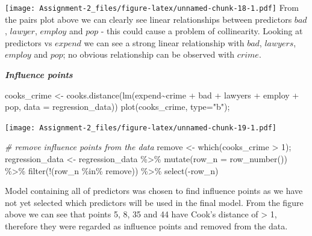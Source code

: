 \documentclass[
  10pt,
]{article}
\newenvironment{Shaded}{\begin{snugshade}}{\end{snugshade}}
\newcommand{\AttributeTok}[1]{\textcolor[rgb]{0.77,0.63,0.00}{#1}}
\newcommand{\CommentTok}[1]{\textcolor[rgb]{0.56,0.35,0.01}{\textit{#1}}}
\newcommand{\DecValTok}[1]{\textcolor[rgb]{0.00,0.00,0.81}{#1}}
\newcommand{\FunctionTok}[1]{\textcolor[rgb]{0.00,0.00,0.00}{#1}}
\newcommand{\NormalTok}[1]{#1}
\newcommand{\OtherTok}[1]{\textcolor[rgb]{0.56,0.35,0.01}{#1}}
\newcommand{\SpecialCharTok}[1]{\textcolor[rgb]{0.00,0.00,0.00}{#1}}
\newcommand{\StringTok}[1]{\textcolor[rgb]{0.31,0.60,0.02}{#1}}
\begin{document}
\texttt{[image: Assignment-2\_files/figure-latex/unnamed-chunk-18-1.pdf]}
From the pairs plot above we can clearly see linear relationships
between predictors \(bad\), \(lawyer\), \(employ\) and \(pop\) - this
could cause a problem of collinearity. Looking at predictors vs
\(expend\) we can see a strong linear relationship with \(bad\),
\(lawyers\), \(employ\) and \(pop\); no obvious relationship can be
observed with \(crime\).

\textbf{\emph{Influence points}}

\begin{Shaded}
\begin{Highlighting}[]
\NormalTok{cooks\_crime }\OtherTok{\textless{}{-}} \FunctionTok{cooks.distance}\NormalTok{(}\FunctionTok{lm}\NormalTok{(expend}\SpecialCharTok{\textasciitilde{}}\NormalTok{crime }\SpecialCharTok{+}\NormalTok{ bad }\SpecialCharTok{+}\NormalTok{ lawyers }\SpecialCharTok{+}\NormalTok{ employ }\SpecialCharTok{+}\NormalTok{ pop, }
                                 \AttributeTok{data =}\NormalTok{ regression\_data))}
\FunctionTok{plot}\NormalTok{(cooks\_crime, }\AttributeTok{type=}\StringTok{"b"}\NormalTok{);}
\end{Highlighting}
\end{Shaded}

\texttt{[image: Assignment-2\_files/figure-latex/unnamed-chunk-19-1.pdf]}

\begin{Shaded}
\begin{Highlighting}[]
\CommentTok{\# remove influence points from the data}
\NormalTok{remove }\OtherTok{\textless{}{-}} \FunctionTok{which}\NormalTok{(cooks\_crime }\SpecialCharTok{\textgreater{}} \DecValTok{1}\NormalTok{); }
\NormalTok{regression\_data }\OtherTok{\textless{}{-}}\NormalTok{ regression\_data }\SpecialCharTok{\%\textgreater{}\%} \FunctionTok{mutate}\NormalTok{(}\AttributeTok{row\_n =} \FunctionTok{row\_number}\NormalTok{()) }\SpecialCharTok{\%\textgreater{}\%}
  \FunctionTok{filter}\NormalTok{(}\SpecialCharTok{!}\NormalTok{(row\_n }\SpecialCharTok{\%in\%}\NormalTok{ remove)) }\SpecialCharTok{\%\textgreater{}\%} \FunctionTok{select}\NormalTok{(}\SpecialCharTok{{-}}\NormalTok{row\_n)}
\end{Highlighting}
\end{Shaded}

Model containing all of predictors was chosen to find influence points
as we have not yet selected which predictors will be used in the final
model. From the figure above we can see that points 5, 8, 35 and 44 have
Cook's distance of \textgreater{} 1, therefore they were regarded as
influence points and removed from the data.
\end{document}
